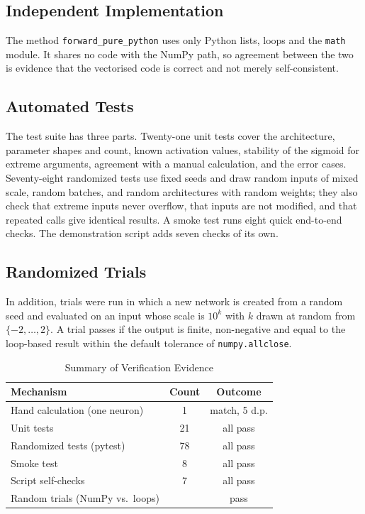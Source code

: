 \documentclass[10pt,letterpaper,twocolumn]{article}
\begin{document}
\subsection{Independent Implementation}
The method \texttt{forward\_pure\_python} uses only Python lists, loops and the \texttt{math} module. It shares no code with the NumPy path, so agreement between the two is evidence that the vectorised code is correct and not merely self-consistent.

\subsection{Automated Tests}
The test suite has three parts. Twenty-one unit tests cover the architecture, parameter shapes and count, known activation values, stability of the sigmoid for extreme arguments, agreement with a manual calculation, and the error cases. Seventy-eight randomized tests use fixed seeds and draw random inputs of mixed scale, random batches, and random architectures with random weights; they also check that extreme inputs never overflow, that inputs are not modified, and that repeated calls give identical results. A smoke test runs eight quick end-to-end checks. The demonstration script adds seven checks of its own.

\subsection{Randomized Trials}
In addition, \numRandN{} trials were run in which a new network is created from a random seed and evaluated on an input whose scale is $10^{k}$ with $k$ drawn at random from $\{-2,\dots,2\}$. A trial passes if the output is finite, non-negative and equal to the loop-based result within the default tolerance of \texttt{numpy.allclose}.

\begin{table}[t]
\caption{Summary of Verification Evidence}
\label{tab:verify}
\centering
\footnotesize
\begin{tabular}{@{}lcc@{}}
\toprule
Mechanism & Count & Outcome \\
\midrule
Hand calculation (one neuron) & 1 & match, 5 d.p. \\
Unit tests & 21 & all pass \\
Randomized tests (pytest) & 78 & all pass \\
Smoke test & 8 & all pass \\
Script self-checks & 7 & all pass \\
Random trials (NumPy vs.\ loops) & \numRandN{} & \numRandOk{} pass \\
\bottomrule
\end{tabular}
\end{table}
\end{document}
